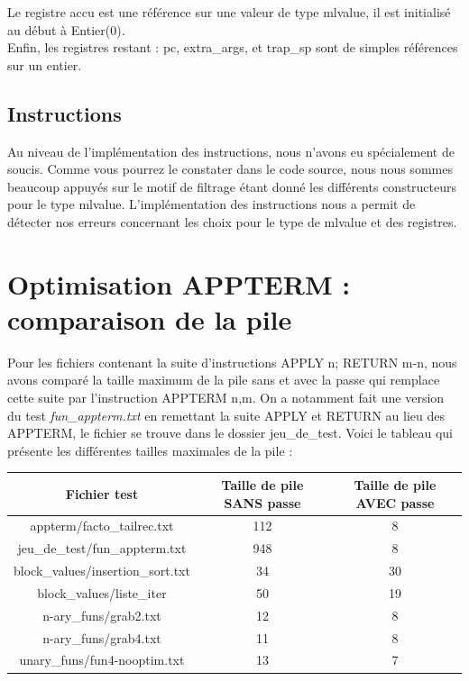 \documentclass[11pt]{article}
\begin{document}
Le registre accu est une référence sur une valeur de type mlvalue, il est initialisé au début à Entier(0).\\
Enfin, les registres restant : pc, extra\_args, et trap\_sp sont de simples références sur un entier.

\subsection{Instructions}
Au niveau de l'implémentation des instructions, nous n'avons eu spécialement de soucis. Comme vous pourrez le constater dans le code source, nous nous sommes beaucoup appuyés sur le motif de filtrage étant donné les différents constructeurs pour le type mlvalue.
L'implémentation des instructions nous a permit de détecter nos erreurs concernant les choix pour le type de mlvalue et des registres.

\section{Optimisation APPTERM : comparaison de la pile}
Pour les fichiers contenant la suite d'instructions APPLY n; RETURN m-n, nous avons comparé la taille maximum de la pile sans et avec la passe qui remplace cette suite par l'instruction APPTERM n,m. On a notamment fait une version du test {\em fun\_appterm.txt} en remettant la suite APPLY et RETURN au lieu des APPTERM, le fichier se trouve dans le dossier jeu\_de\_test.
Voici le tableau qui présente les différentes tailles maximales de la pile :\\
\begin{center}
\begin{tabular}{|c|c|c|}

\hline
\textbf{Fichier test} & \textbf{Taille de pile SANS passe} & \textbf{Taille de pile AVEC passe} \\
\hline
appterm/facto\_tailrec.txt & 112 & 8 \\
\hline
jeu\_de\_test/fun\_appterm.txt & 948 & 8 \\
\hline
block\_values/insertion\_sort.txt & 34 & 30  \\
\hline
block\_values/liste\_iter & 50 & 19  \\
\hline
n-ary\_funs/grab2.txt & 12 & 8 \\
\hline
n-ary\_funs/grab4.txt & 11 & 8 \\
\hline
unary\_funs/fun4-nooptim.txt & 13 & 7  \\
\hline

\end{tabular}
\end{center}
\end{document}
